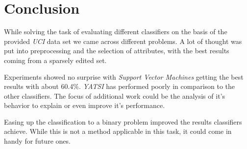 \section{Conclusion}

While solving the task of evaluating different classifiers on the basis of the provided \textit{UCI} data set we came across 
different problems. A lot of thought was put into preprocessing and the selection of attributes, with the best results 
coming from a sparsely edited set.

Experiments showed no surprise with \textit{Support Vector Machines} getting the best results with about 60.4\%. \textit{YATSI} has performed poorly in 
comparison to the other classifiers. The focus of additional work could be the analysis of it's behavior to explain or 
even improve it's performance.

Easing up the classification to a binary problem improved the results classifiers achieve. While this is not a method 
applicable in this task, it could come in handy for future ones.